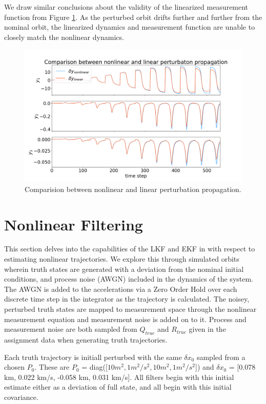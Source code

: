 \documentclass[11pt, a4paper]{article}
\begin{document}
We draw similar conclusions about the validity of the linearized measurement function from Figure \ref{fig:nlvl_m}.
As the perturbed orbit drifts further and further from the nominal orbit, the linearized dynamics and measurement function are unable to closely match the nonlinear dynamics. 
 

\begin{figure}[H]
	\centering
	\includegraphics[width=\textwidth]{./Figures/nonlvl_meas.png}
	\caption{Comparision between nonlinear and linear perturbation propagation.}
	\label{fig:nlvl_m}
\end{figure}


\section{Nonlinear Filtering}
This section delves into the capabilities of the LKF and EKF in with respect to estimating nonlinear trajectories. 
We explore this through simulated orbits wherein truth states are generated with a deviation from the nominal initial conditions, and process noise (AWGN) included in the dynamics of the system. 
The AWGN is added to the accelerations via a Zero Order Hold over each discrete time step in the integrator as the trajectory is calculated. 
The noisey, perturbed truth states are mapped to measurement space through the nonlinear measurement equation and measurement noise is added on to it.
Process and measurement noise are both sampled from $Q_{true}$ and $R_{true}$ given in the assignment data when generating truth trajectories.

Each truth trajectory is initiall perturbed with the same $\delta x_0$ sampled from a chosen $P_0$. These are $P_0$ = diag([$10m^2, 1m^2/s^2, 10m^2, 1m^2/s^2$]) and $\delta x_0$ = [0.078 km, 0.022 km/s, -0.058 km, 0.031 km/s].
All filters begin with this initial estimate either as a deviation of full state, and all begin with this initial covariance. 
\end{document}

